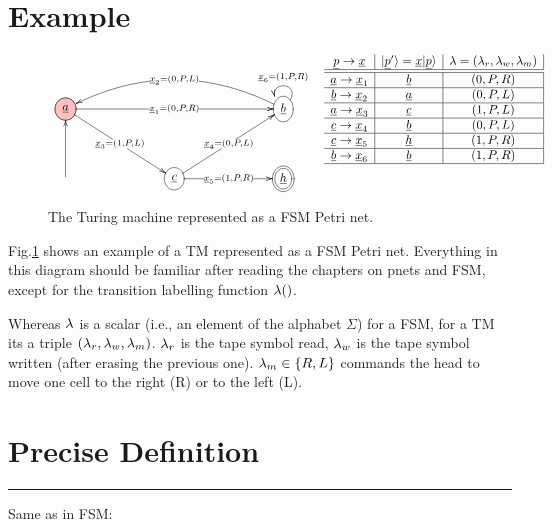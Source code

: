 \section{Example}

\begin{figure}[h!]
$$
\begin{array}{cc}
\xymatrix@C=6pc@R=3pc{
\PinkCircle{\rva}
\ar[rr]|{\rvx_1=(0,P,R)}
\ar[rd]|{\rvx_3=(1,P, L)}
&&\Circle{\rvb}\ar@(ru,lu)[]_{\rvx_6=(1,P,R)}
\ar@/_2pc/[ll]|{\rvx_2=(0,P,L)}
\\
\ar[u]
&\Circle{\rvc}
\ar[ru]|{\rvx_4=(0,P, L)}
\ar[r]|{\rvx_5=(1,P, R)}
&\DCircle{\rvh}
}
&
\begin{array}{c|c|c|}
\rvp\rarrow \rvx
&\ket{\rvp'}=\rvx\ket{\rvp}
& \lam=(\lam_r,
\lam_w,
\lam_m)
\\
\hline\hline
\rva\rarrow\rvx_1
&\rvb
&(0,P,R)
\\ \hline
\rvb\rarrow\rvx_2
&\rva
&(0,P,L)
\\ \hline
\rva\rarrow\rvx_3
&\rvc
& (1,P,L)
\\ \hline
\rvc\rarrow\rvx_4
&\rvb
& (0,P,L)
\\\hline
\rvc\rarrow\rvx_5
&\rvh
&(1,P,R)
\\ \hline
\rvb\rarrow\rvx_6
&\rvb
&(1,P,R)
\\ \hline
\end{array}
\end{array}
$$
\caption{The  Turing machine represented as a FSM Petri net.}
\label{fig-3-state-bb}
\end{figure}

Fig.\ref{fig-3-state-bb} shows an example of
a TM represented as a FSM Petri net. Everything in this diagram
should be familiar after reading the chapters
on pnets and FSM, except for the
transition  labelling function $\lambda()$.

Whereas $\lambda$ is a scalar (i.e., an element of the alphabet $\Sigma$)
for a FSM, for a TM its a triple $(\lambda_r, \lambda_w, \lambda_m)$.
$\lambda_r$ is the tape symbol read, $\lambda_w$
is the tape symbol written (after erasing the 
previous one). $\lambda_m\in\{R, L\}$
commands the head to move one cell to the right (R)
or to the left (L).



\section{Precise Definition}

\hrule
Same as in FSM:

